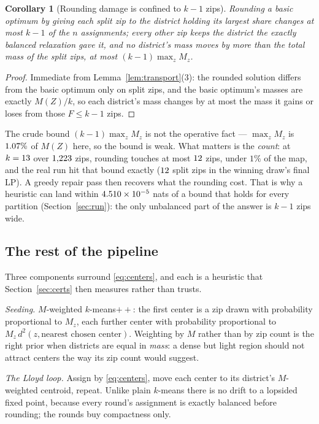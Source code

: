 \documentclass[11pt]{article}
\newtheorem{cor}[prop]{Corollary}
\theoremstyle{definition}
\begin{document}
\begin{cor}[Rounding damage is confined to $k-1$ zips]\label{cor:rounding}
Rounding a basic optimum by giving each split zip to the district holding its largest share
changes at most $k-1$ of the $n$ assignments; every other zip keeps the district the exactly
balanced relaxation gave it, and no district's mass moves by more than the total mass of the
split zips, at most $(k-1)\max_z M_z$.
\end{cor}

\begin{proof}
Immediate from Lemma~\ref{lem:transport}(3): the rounded solution differs from the basic
optimum only on split zips, and the basic optimum's masses are exactly $M(Z)/k$, so each
district's mass changes by at most the mass it gains or loses from those $F\le k-1$ zips.
\end{proof}

The crude bound $(k-1)\max_z M_z$ is not the operative fact --- $\max_z M_z$ is
$1.07\%$ of $M(Z)$ here, so the bound is weak. What matters is the \emph{count}:
at $k=13$ over $1{,}223$ zips, rounding touches at most $12$ zips,
under $1\%$ of the map, and the real run hit that bound exactly ($12$ split zips
in the winning draw's final LP). A greedy repair pass then recovers what the rounding cost.
That is why a heuristic can land within $4.510\times10^{-5}$ nats of a bound that holds for every
partition (Section~\ref{sec:run}): the only unbalanced part of the answer is $k-1$ zips
wide.

\subsection{The rest of the pipeline}

Three components surround \eqref{eq:centers}, and each is a heuristic that
Section~\ref{sec:certs} then measures rather than trusts.

\emph{Seeding.} $M$-weighted \mbox{$k$-means}$++$: the first center is a zip drawn with
probability proportional to $M_z$, each further center with probability proportional to
$M_z\,d^2(z,\text{nearest chosen center})$. Weighting by $M$ rather than by zip count is the
right prior when districts are equal in \emph{mass}: a dense but light region should not
attract centers the way its zip count would suggest.

\emph{The Lloyd loop.} Assign by \eqref{eq:centers}, move each center to its district's
$M$-weighted centroid, repeat. Unlike plain $k$-means there is no drift to a lopsided fixed
point, because every round's assignment is exactly balanced before rounding; the rounds buy
compactness only.
\end{document}
